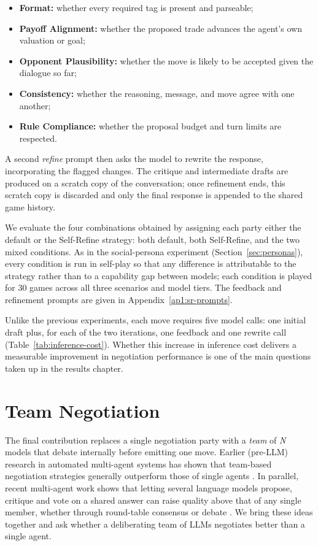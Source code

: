 \begin{itemize}
\item \textbf{Format:} whether every required tag is present and parseable;
\item \textbf{Payoff Alignment:} whether the proposed trade advances the agent's own valuation or goal;
\item \textbf{Opponent Plausibility:} whether the move is likely to be accepted given the dialogue so far;
\item \textbf{Consistency:} whether the reasoning, message, and move agree with one another;
\item \textbf{Rule Compliance:} whether the proposal budget and turn limits are respected.
\end{itemize}

A second \textit{refine} prompt then asks the model to rewrite the response, incorporating the flagged changes. The critique and intermediate drafts are produced on a scratch copy of the conversation; once refinement ends, this scratch copy is discarded and only the final response is appended to the shared game history.

We evaluate the four combinations obtained by assigning each party either the default or the Self-Refine strategy: both default, both Self-Refine, and the two mixed conditions. As in the social-persona experiment (Section~\ref{sec:personas}), every condition is run in self-play so that any difference is attributable to the strategy rather than to a capability gap between models; each condition is played for 30 games across all three scenarios and model tiers. The feedback and refinement prompts are given in Appendix~\ref{ap1:sr-prompts}.

Unlike the previous experiments, each move requires five model calls: one initial draft plus, for each of the two iterations, one feedback and one rewrite call (Table~\ref{tab:inference-cost}). Whether this increase in inference cost delivers a measurable improvement in negotiation performance is one of the main questions taken up in the results chapter.

\section{Team Negotiation} \label{sec:team-negotiation}

The final contribution replaces a single negotiation party with a \textit{team} of \textit{N} models that debate internally before emitting one move. Earlier (pre-LLM) research in automated multi-agent systems has shown that team-based negotiation strategies generally outperform those of single agents \cite{S_nchez_Anguix_2013}. In parallel, recent multi-agent work shows that letting several language models propose, critique and vote on a shared answer can raise quality above that of any single member, whether through round-table consensus \cite{chen2024reconcileroundtableconferenceimproves} or debate \cite{du2023improvingfactualityreasoninglanguage}. We bring these ideas together and ask whether a deliberating team of LLMs negotiates better than a single agent. 

